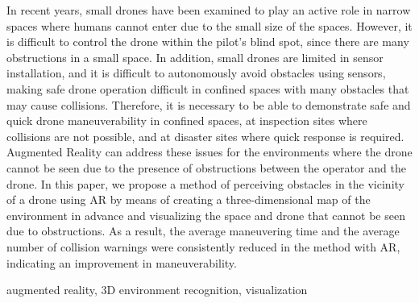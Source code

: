 \documentclass[submit]{ipsj}
\begin{document}
\begin{eabstract}
In recent years, small drones have been examined to play an active role in narrow spaces where humans cannot enter due to the small size of the spaces. 
However, it is difficult to control the drone within the pilot’s blind spot, since there are many obstructions in a small space. 
In addition, small drones are limited in sensor installation, and it is difficult to autonomously avoid obstacles using sensors, making safe drone operation difficult in confined spaces with many obstacles that may cause collisions. 
Therefore, it is necessary to be able to demonstrate safe and quick drone maneuverability in confined spaces, at inspection sites where collisions are not possible, and at disaster sites where quick response is required.
Augmented Reality can address these issues for the environments where the drone cannot be seen due to the presence of obstructions between the operator and the drone. 
In this paper, we propose a method of perceiving obstacles in the vicinity of a drone using AR by means of creating a three-dimensional map of the environment in advance and visualizing the space and drone that cannot be seen due to obstructions. As a result, the average maneuvering time and the average number of collision warnings were consistently reduced in the method with AR, indicating an improvement in maneuverability.
\end{eabstract}

\begin{ekeyword}
augmented reality, 3D environment recognition, visualization
\end{ekeyword}

\maketitle

\end{document}
